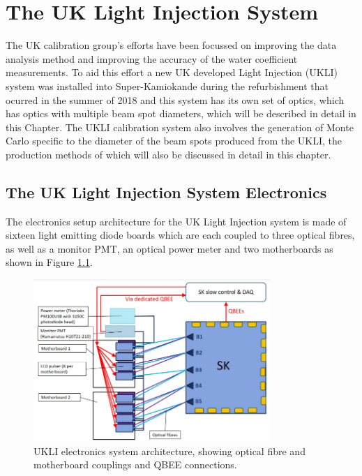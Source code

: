 \chapter{The UK Light Injection System}
\label{chp:ukli}

The UK calibration group's efforts have been focussed on improving the data analysis method and improving the accuracy of the water coefficient measurements. To aid this effort a new UK developed Light Injection (UKLI) system was installed into Super-Kamiokande during the refurbishment that ocurred in the summer of 2018 and this system has its own set of optics, which has optics with multiple beam spot diameters, which will be described in detail in this Chapter. The UKLI calibration system also involves the generation of Monte Carlo specific to the diameter of the beam spots produced from the UKLI, the production methods of which will also be discussed in detail in this chapter.

\section{The UK Light Injection System Electronics}

The electronics setup architecture for the UK Light Injection system is made of sixteen light emitting diode boards which are each coupled to three optical fibres, as well as a monitor PMT, an optical power meter and two motherboards as shown in Figure \ref{fig:ukli_system_architecture}. 

\begin{figure}
    \centering
    \includegraphics[width=0.8\textwidth]{Figures/ukli_system_architecture.png}
    \caption{UKLI electronics system architecture, showing optical fibre and motherboard couplings and QBEE connections.}
    \label{fig:ukli_system_architecture}
\end{figure}

